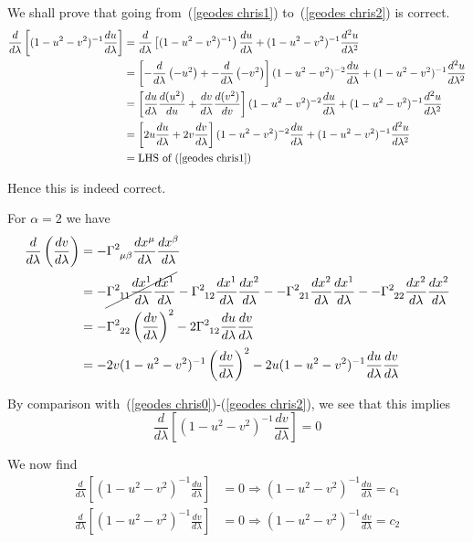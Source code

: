 \documentclass[a4paper]{article} %
\newcommand{\ph}[1]{\phantom{#1}}
\begin{document}
We shall prove that going from~(\ref{geodes chris1}) to~(\ref{geodes chris2}) is correct.
\begin{align}
\frac{d}{d\lambda}\left[(1-u^2-v^2)^{-1}\frac{du}{d\lambda}\right]&=
\frac{d}{d\lambda}\left[(1-u^2-v^2)^{-1}\right)\frac{du}{d\lambda}+(1-u^2-v^2)^{-1}\frac{d^2 u}{d\lambda^2}\\
&=\left[-\frac{d}{d\lambda}\left(-u^2\right)+-\frac{d}{d\lambda}\left(-v^2\right)\right]
(1-u^2-v^2)^{-2}\frac{du}{d\lambda}+(1-u^2-v^2)^{-1}\frac{d^2 u}{d\lambda^2}\\
&=\left[\frac{du}{d\lambda}\frac{d(u^2)}{du}+\frac{dv}{d\lambda}\frac{d(v^2)}{dv}\right]
(1-u^2-v^2)^{-2}\frac{du}{d\lambda}+(1-u^2-v^2)^{-1}\frac{d^2 u}{d\lambda^2}\\
&=\left[2u\frac{du}{d\lambda}+2v\frac{dv}{d\lambda}\right]
(1-u^2-v^2)^{-2}\frac{du}{d\lambda}+(1-u^2-v^2)^{-1}\frac{d^2 u}{d\lambda^2}\\
&=\text{LHS of}~(\ref{geodes chris1})
\end{align}

Hence this is indeed correct.

For $\alpha=2$ we have
\begin{align}
\frac{d}{d\lambda}\left(\frac{dv}{d\lambda}\right)&=-\Gamma^{2}_{\ph{1}\mu\beta}
\frac{dx^{\mu}}{d\lambda}\frac{dx^{\beta}}{d\lambda}\\
&=-\cancel{\Gamma^{2}_{\ph{2}11}\frac{dx^{1}}{d\lambda}\frac{dx^{1}}{d\lambda}}
-\Gamma^{2}_{\ph{2}12}\frac{dx^{1}}{d\lambda}\frac{dx^{2}}{d\lambda}-
-\Gamma^{2}_{\ph{2}21}\frac{dx^{2}}{d\lambda}\frac{dx^{1}}{d\lambda}-
-\Gamma^{2}_{\ph{2}22}\frac{dx^{2}}{d\lambda}\frac{dx^{2}}{d\lambda}\\
&=-\Gamma^{2}_{\ph{2}22}\left(\frac{dv}{d\lambda}\right)^2
-2\Gamma^{2}_{\ph{2}12}\frac{du}{d\lambda}\frac{dv}{d\lambda}\\
&=-2v(1-u^2-v^2)^{-1}\left(\frac{dv}{d\lambda}\right)^2
-2u(1-u^2-v^2)^{-1}\frac{du}{d\lambda}\frac{dv}{d\lambda}
\end{align}

By comparison with~(\ref{geodes chris0})-(\ref{geodes chris2}), we see that this implies
\begin{equation}
\frac{d}{d\lambda}\left[(1-u^2-v^2)^{-1}\frac{dv}{d\lambda}\right]=0
\end{equation}

We now find
\begin{align}
\frac{d}{d\lambda}\left[(1-u^2-v^2)^{-1}\frac{du}{d\lambda}\right]&=0\Rightarrow
(1-u^2-v^2)^{-1}\frac{du}{d\lambda}=c_1	\label{divide1}\\
\frac{d}{d\lambda}\left[(1-u^2-v^2)^{-1}\frac{dv}{d\lambda}\right]&=0\Rightarrow
(1-u^2-v^2)^{-1}\frac{dv}{d\lambda}=c_2	\label{divide2}
\end{align}
\end{document}
